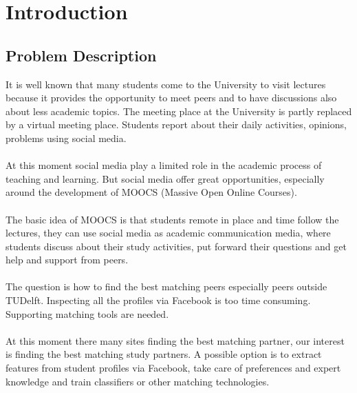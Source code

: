 \chapter{Introduction}

\section{Problem Description}
It is well known that many students come to the University to visit lectures because it provides the opportunity to meet peers and to have discussions also about less academic topics. 
The meeting place at the University is partly replaced by a virtual meeting place. 
Students report about their daily activities, opinions, problems using social media. 
\\\\
At this moment social media play a limited role in the academic process of teaching and learning. 
But social media offer great opportunities, especially around the development of MOOCS (Massive Open Online Courses). 
\\\\
The basic idea of MOOCS is that students remote in place and time follow the lectures, they can use social media as academic communication media, where students discuss about their study activities, put forward their questions and get help and support from peers. 
\\\\
The question is how to find the best matching peers especially peers outside TUDelft. 
Inspecting all the profiles via Facebook is too time consuming. 
Supporting matching tools are needed. 
\\\\
At this moment there many sites finding the best matching partner, our interest is finding the best matching study partners. 
A possible option is to extract features from student profiles via Facebook, take care of preferences and expert knowledge and train classifiers or other matching technologies.

